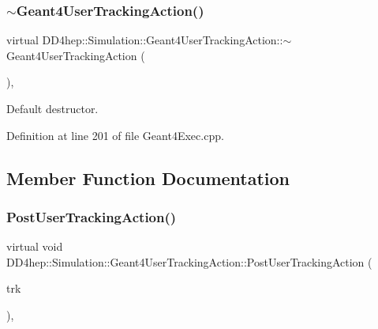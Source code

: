 \hypertarget{class_d_d4hep_1_1_simulation_1_1_geant4_user_tracking_action_a2c2e499d1ac638f2519fa8f6f221bdc0}{}\label{class_d_d4hep_1_1_simulation_1_1_geant4_user_tracking_action_a2c2e499d1ac638f2519fa8f6f221bdc0} 
\subsubsection{\texorpdfstring{$\sim$\+Geant4\+User\+Tracking\+Action()}{~Geant4UserTrackingAction()}}
{\footnotesize\ttfamily virtual D\+D4hep\+::\+Simulation\+::\+Geant4\+User\+Tracking\+Action\+::$\sim$\+Geant4\+User\+Tracking\+Action (\begin{DoxyParamCaption}{ }\end{DoxyParamCaption})\hspace{0.3cm}{\ttfamily [inline]}, {\ttfamily [virtual]}}



Default destructor. 



Definition at line 201 of file Geant4\+Exec.\+cpp.



\subsection{Member Function Documentation}
\hypertarget{class_d_d4hep_1_1_simulation_1_1_geant4_user_tracking_action_ab5aeccf26ec4213e75bbdf6927bc7ee6}{}\label{class_d_d4hep_1_1_simulation_1_1_geant4_user_tracking_action_ab5aeccf26ec4213e75bbdf6927bc7ee6} 
\subsubsection{\texorpdfstring{Post\+User\+Tracking\+Action()}{PostUserTrackingAction()}}
{\footnotesize\ttfamily virtual void D\+D4hep\+::\+Simulation\+::\+Geant4\+User\+Tracking\+Action\+::\+Post\+User\+Tracking\+Action (\begin{DoxyParamCaption}\item[{const G4\+Track $\ast$}]{trk }\end{DoxyParamCaption})\hspace{0.3cm}{\ttfamily [inline]}, {\ttfamily [virtual]}}



